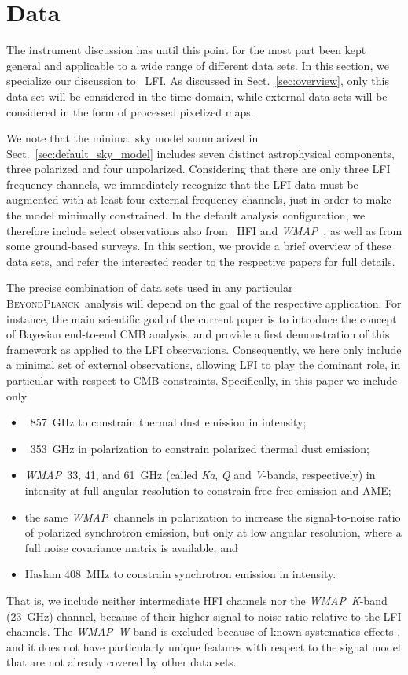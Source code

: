 \documentclass[twocolumn]{aa}
\def\WMAP{\emph{WMAP}}
\newcommand{\BP}{\textsc{BeyondPlanck}}
\begin{document}
\section{Data}
\label{sec:data}

The instrument discussion has until this point for the most part been
kept general and applicable to a wide range of different data sets. In
this section, we specialize our discussion to \Planck\ LFI. As
discussed in Sect.~\ref{sec:overview}, only this data set will be
considered in the time-domain, while external data sets will be
considered in the form of processed pixelized maps.

We note that the minimal sky model summarized in
Sect.~\ref{sec:default_sky_model} includes seven distinct
astrophysical components, three polarized and four
unpolarized. Considering that there are only three LFI frequency
channels, we immediately recognize that the LFI data must be augmented
with at least four external frequency channels, just in order to make
the model minimally constrained. In the default analysis
configuration, we therefore include select observations also from
\Planck\ HFI \citep{planck2020-LVII} and \WMAP\ \citep{bennett2012}, as well as
from some ground-based surveys. In this section, we provide a brief
overview of these data sets, and refer the interested reader to the
respective papers for full details.

The precise combination of data sets used in any particular
\BP\ analysis will depend on the goal of the respective
application. For instance, the main scientific goal of the current
paper is to introduce the concept of Bayesian end-to-end CMB analysis,
and provide a first demonstration of this framework as applied to the
LFI observations. Consequently, we here only include a minimal set of
external observations, allowing LFI to play the dominant role, in
particular with respect to CMB constraints. Specifically, in this
paper we include only
\begin{itemize}
\item \Planck\ 857~GHz to constrain thermal dust emission in intensity;
\item \Planck\ 353~GHz in polarization to constrain polarized thermal
  dust emission;
\item \WMAP\ 33, 41, and 61~GHz (called \emph{Ka}, \emph{Q} and \emph{V}-bands,
  respectively) in intensity at full angular resolution to constrain
  free-free emission and AME;
\item the same \WMAP\ channels in polarization to increase the signal-to-noise
  ratio of polarized synchrotron emission, but only at low angular
  resolution, where a full noise covariance matrix is available; and
\item Haslam 408~MHz \citep{haslam1982} to constrain synchrotron emission in intensity.
\end{itemize}
That is, we include neither intermediate HFI channels nor the
\WMAP\ \emph K-band (23~GHz) channel, because of their higher
signal-to-noise ratio relative to the LFI channels. The \WMAP\ \emph W-band
is excluded because of known systematics effects \citep{bennett2012},
and it does not have particularly unique features with respect to the
signal model that are not already covered by other data sets.
\end{document}
